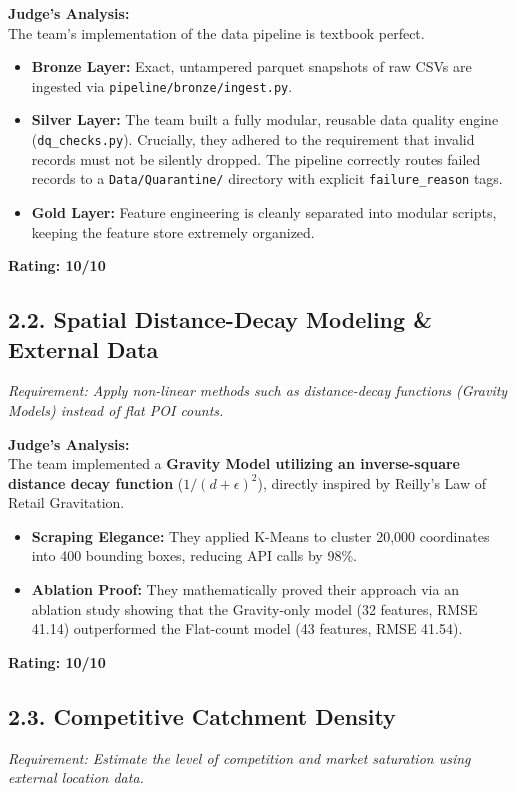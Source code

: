 \documentclass[11pt, a4paper]{article}
\begin{document}
\textbf{\textcolor{judgereview}{Judge's Analysis:}} \\
The team's implementation of the data pipeline is textbook perfect. 
\begin{itemize}[leftmargin=*]
    \item \textbf{Bronze Layer:} Exact, untampered parquet snapshots of raw CSVs are ingested via \texttt{pipeline/bronze/ingest.py}.
    \item \textbf{Silver Layer:} The team built a fully modular, reusable data quality engine (\texttt{dq\_checks.py}). Crucially, they adhered to the requirement that invalid records must not be silently dropped. The pipeline correctly routes failed records to a \texttt{Data/Quarantine/} directory with explicit \texttt{failure\_reason} tags.
    \item \textbf{Gold Layer:} Feature engineering is cleanly separated into modular scripts, keeping the feature store extremely organized.
\end{itemize}
\textbf{Rating: 10/10}

\subsection*{2.2. Spatial Distance-Decay Modeling \& External Data}
\textit{Requirement: Apply non-linear methods such as distance-decay functions (Gravity Models) instead of flat POI counts.}

\textbf{\textcolor{judgereview}{Judge's Analysis:}} \\
The team implemented a \textbf{Gravity Model utilizing an inverse-square distance decay function} ($1/(d + \epsilon)^2$), directly inspired by Reilly's Law of Retail Gravitation. 
\begin{itemize}[leftmargin=*]
    \item \textbf{Scraping Elegance:} They applied K-Means to cluster 20,000 coordinates into 400 bounding boxes, reducing API calls by 98\%.
    \item \textbf{Ablation Proof:} They mathematically proved their approach via an ablation study showing that the Gravity-only model (32 features, RMSE 41.14) outperformed the Flat-count model (43 features, RMSE 41.54).
\end{itemize}
\textbf{Rating: 10/10}

\subsection*{2.3. Competitive Catchment Density}
\textit{Requirement: Estimate the level of competition and market saturation using external location data.}
\end{document}
